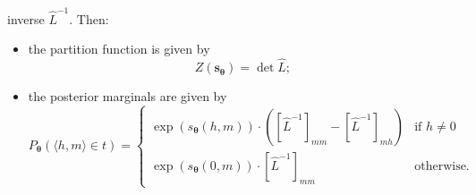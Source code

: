 \begin{itemize}
inverse $\hat{L}^{-1}$. %
Then: %
\begin{itemize}
\item the partition function is given by 
\begin{equation}
Z(\mathbf{s_{\boldsymbol{\theta}}}) = \det \hat{L};
\end{equation}
\item the posterior marginals 
are given by 
\begin{equation}
P_{\boldsymbol{\theta}}(\langle h,m \rangle \in t) = \left\{
\begin{array}{ll}
\exp(s_{\boldsymbol{\theta}}(h,m))\cdot([\hat{L}^{-1}]_{mm} - 
[\hat{L}^{-1}]_{mh}) & \text{if $h \ne 0$}\\
\exp(s_{\boldsymbol{\theta}}(0,m))\cdot[\hat{L}^{-1}]_{mm} & \text{otherwise.}
\end{array}
\right.
\end{equation}
\end{itemize}
\end{itemize}

